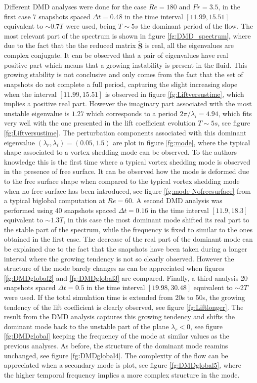 Different DMD analyses were done for the case $Re=180$ and $Fr=3.5$, in the first case 7 snapshots spaced $\Delta t=0.48$ in the time interval $[11.99,15.51]$ equivalent to $\sim0.7T$ were used, being $T\sim5s$ the dominant period of the flow. The most relevant part of the spectrum is shown in figure \ref{fg:DMD_spectrum}, where due to the fact that the the reduced matrix $\mathbf{\widetilde{S}}$ is real, all the eigenvalues are complex conjugate. It can be observed that a pair of eigenvalues have real positive part which means that a growing instability is present in the fluid. This growing stability is not conclusive and only comes from the fact that the set of snapshots do not complete a full period, capturing the slight increasing slope when the interval $[11.99,15.51]$ is observed in figure \ref{fg:Liftversustime}, which implies a positive real part. However the imaginary part associated with the most unstable eigenvalue is $1.27$ which corresponds to a period $2\pi/\lambda_i=4.94$, which fits very well with the one presented in the lift coefficient evolution $T\sim5s$, see figure \ref{fg:Liftversustime}. The perturbation components associated with this dominant eigenvalue $(\lambda_r,\lambda_i)=(0.05,1.5)$ are plot in figure \ref{fg:mode}, where the typical shape associated to a vortex shedding mode can be observed. To the authors knowledge this is the first time where a typical vortex shedding mode is observed in the presence of free surface. It can be observed how the mode is deformed due to the free surface shape when compared to the typical vortex shedding mode when no free surface has been introduced, see figure \ref{fg:mode Nofreesurface} from a typical biglobal computation at $Re=60$. A second DMD analysis was performed using 40 snapshots spaced $\Delta t=0.16$ in the time interval $[11.9,18.3]$ equivalent to $\sim 1.3T$, in this case the most dominant mode shifted its real part to the stable part of the spectrum, while the frequency is fixed to similar to the ones obtained in the first case. The decrease of the real part of the dominant mode can be explained due to the fact that the snapshots have been taken during a longer interval where the growing tendency is not so clearly observed. However the structure of the mode barely changes as can be appreciated when figures \ref{fg:DMDglobal2} and \ref{fg:DMDglobal3} are compared. Finally, a third analysis 20 snapshots spaced $\Delta t=0.5$ in the time interval $[19.98,30.48]$ equivalent to $\sim2T$ were used. If the total simulation time is extended from 20s to 50s, the growing tendency of the lift coefficient is clearly observed, see figure \ref{fg:Liftlonger}. The result from the DMD analysis captures this growing tendency and shifts the dominant mode back to the unstable part of the plane $\lambda_r<0$, see figure \ref{fg:DMDglobal} keeping the frequency of the mode at similar values as the previous analyses. As before, the structure of the dominant mode reamins unchanged, see figure \ref{fg:DMDglobal4}. The complexity of the flow can be appreciated when a secondary mode is plot, see figure \ref{fg:DMDglobal5}, where the higher temporal frequency implies a more complex structure in the mode.



